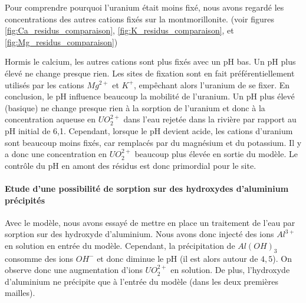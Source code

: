 \documentclass{article}
\begin{document}
Pour comprendre pourquoi l’uranium était moins fixé, nous avons regardé les concentrations des autres cations fixés sur la montmorillonite. (voir figures \ref{fig:Ca_residus_comparaison}, \ref{fig:K_residus_comparaison}, et \ref{fig:Mg_residus_comparaison})

Hormis le calcium, les autres cations sont plus fixés avec un pH bas. Un pH plus élevé ne change presque rien. Les sites de fixation sont en fait préférentiellement utilisés par les cations $Mg^{2+}$ et $K^{+}$, empêchant alors l’uranium de se fixer.
En conclusion, le pH influence beaucoup la mobilité de l’uranium. Un pH plus élevé (basique) ne change presque rien à la sorption de l’uranium et donc à la concentration aqueuse en $UO_2^{2+}$ dans l’eau rejetée dans la rivière par rapport au pH initial de 6,1. Cependant, lorsque le pH devient acide, les cations d’uranium sont beaucoup moins fixés, car remplacés par du magnésium et du potassium. Il y a donc une concentration en $UO_2^{2+}$ beaucoup plus élevée en sortie du modèle. Le contrôle du pH en amont des résidus est donc primordial pour le site.

\paragraph{Etude d'une possibilité de sorption sur des hydroxydes d'aluminium précipités}
Avec le modèle, nous avons essayé de mettre en place un traitement de l’eau par sorption sur des hydroxyde d’aluminium. Nous avons donc injecté des ions $Al^{3+}$ en solution en entrée du modèle. Cependant, la précipitation de $Al(OH)_3$ consomme des ions $OH^{-}$ et donc diminue le pH (il est alors autour de $4,5$). On observe donc une augmentation d’ions $UO_2^{2+}$ en solution. De plus, l’hydroxyde d’aluminium ne précipite que à l’entrée du modèle (dans les deux premières mailles).
\end{document}
